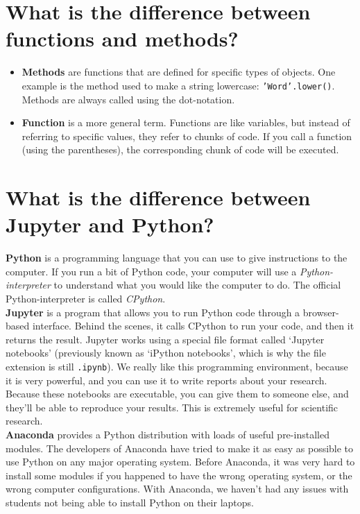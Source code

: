 \documentclass[12pt]{book}
\begin{document}
\section{What is the difference between functions and methods?}

\begin{itemize}
\item \textbf{Methods} are functions that are defined for specific types of objects. One example is the method used to make a string lowercase: \texttt{'Word'.lower()}. Methods are always called using the dot-notation.
\item \textbf{Function} is a more general term. Functions are like variables, but instead of referring to specific values, they refer to chunks of code. If you call a function (using the parentheses), the corresponding chunk of code will be executed.
\end{itemize}

\section{What is the difference between Jupyter and Python?}

\textbf{Python} is a programming language that you can use to give instructions to the computer. If you run a bit of Python code, your computer will use a \emph{Python-interpreter} to understand what you would like the computer to do. The official Python-interpreter is called \emph{CPython}.\\

\noindent \textbf{Jupyter} is a program that allows you to run Python code through a browser-based interface. Behind the scenes, it calls CPython to run your code, and then it returns the result. Jupyter works using a special file format called `Jupyter notebooks' (previously known as `iPython notebooks', which is why the file extension is still \texttt{.ipynb}). We really like this programming environment, because it is very powerful, and you can use it to write reports about your research. Because these notebooks are executable, you can give them to someone else, and they'll be able to reproduce your results. This is extremely useful for scientific research.\\

\noindent \textbf{Anaconda} provides a Python distribution with loads of useful pre-installed modules. The developers of Anaconda have tried to make it as easy as possible to use Python on any major operating system. Before Anaconda, it was very hard to install some modules if you happened to have the wrong operating system, or the wrong computer configurations. With Anaconda, we haven't had any issues with students not being able to install Python on their laptops. 
\end{document}
